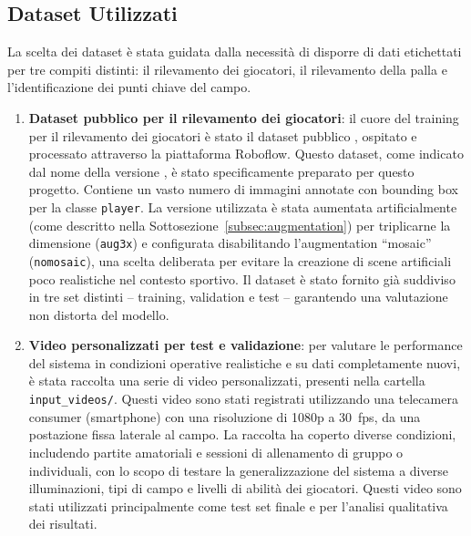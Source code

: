 \documentclass[12pt,a4paper,openright,twoside]{book}
\begin{document}
\subsection{Dataset Utilizzati}
\label{sec:dataset-utilizzati}
\noindent La scelta dei dataset è stata guidata dalla necessità di disporre di dati etichettati per tre compiti distinti: 
il rilevamento dei giocatori, il rilevamento della palla e l'identificazione dei punti chiave del campo.
\begin{enumerate}
  \item \textbf{Dataset pubblico per il rilevamento dei giocatori}: il cuore del training per il rilevamento dei giocatori è 
  stato il dataset pubblico \texttt{}, ospitato e processato attraverso la piattaforma Roboflow. 
  Questo dataset, come indicato dal nome della versione \texttt{}, è stato specificamente preparato 
  per questo progetto. Contiene un vasto numero di immagini annotate con bounding box per la classe \texttt{player}. 
  La versione utilizzata è stata aumentata artificialmente (come descritto nella Sottosezione~\ref{subsec:augmentation})
  per triplicarne la dimensione (\texttt{aug3x}) e configurata disabilitando l'augmentation ``mosaic'' (\texttt{nomosaic}), 
  una scelta deliberata per evitare la creazione di scene artificiali poco realistiche nel contesto sportivo.
  Il dataset è stato fornito già suddiviso in tre set distinti -- training, validation e test -- garantendo una 
  valutazione non distorta del modello.
  
  \item \textbf{Video personalizzati per test e validazione}: per valutare le performance del sistema in condizioni operative 
  realistiche e su dati completamente nuovi, è stata raccolta una serie di video personalizzati, presenti nella 
  cartella \texttt{input\_videos/}. Questi video sono stati registrati utilizzando una telecamera consumer (smartphone) 
  con una risoluzione di 1080p a 30~\ac{fps}, da una postazione fissa laterale al campo.
  La raccolta ha coperto diverse condizioni, includendo partite amatoriali e sessioni di allenamento di gruppo o individuali, 
  con lo scopo di testare la generalizzazione del sistema a diverse illuminazioni, tipi di campo e livelli di abilità dei giocatori. 
  Questi video sono stati utilizzati principalmente come test set finale e per l'analisi qualitativa dei risultati.
\end{enumerate}
\end{document}
